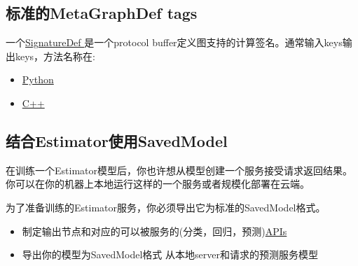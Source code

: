 \subsection{标准的MetaGraphDef tags}
一个\href{https://github.com/tensorflow/tensorflow/blob/master/tensorflow/core/protobuf/meta_graph.proto}{SignatureDef }是一个protocol buffer定义图支持的计算签名。通常输入keys输出keys，方法名称在:
\begin{itemize}
\item \href{https://github.com/tensorflow/tensorflow/blob/master/tensorflow/python/saved_model/signature_constants.py}{Python}
\item \href{https://github.com/tensorflow/tensorflow/blob/master/tensorflow/cc/saved_model/signature_constants.h}{C++}
\end{itemize}
\subsection{结合Estimator使用SavedModel}
在训练一个Estimator模型后，你也许想从模型创建一个服务接受请求返回结果。你可以在你的机器上本地运行这样的一个服务或者规模化部署在云端。

为了准备训练的Estimator服务，你必须导出它为标准的SavedModel格式。
\begin{itemize}
\item 制定输出节点和对应的可以被服务的(分类，回归，预测)\href{https://github.com/tensorflow/serving/blob/master/tensorflow_serving/apis/prediction_service.proto}{APIs}
\item 导出你的模型为SavedModel格式
\ite 从本地server和请求的预测服务模型
\end{itemize}
